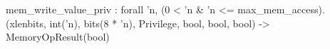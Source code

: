 mem_write_value_priv : forall 'n, (0 < 'n & 'n <= max_mem_access).
  (xlenbits, int('n), bits(8 * 'n), Privilege, bool, bool, bool) -> MemoryOpResult(bool)